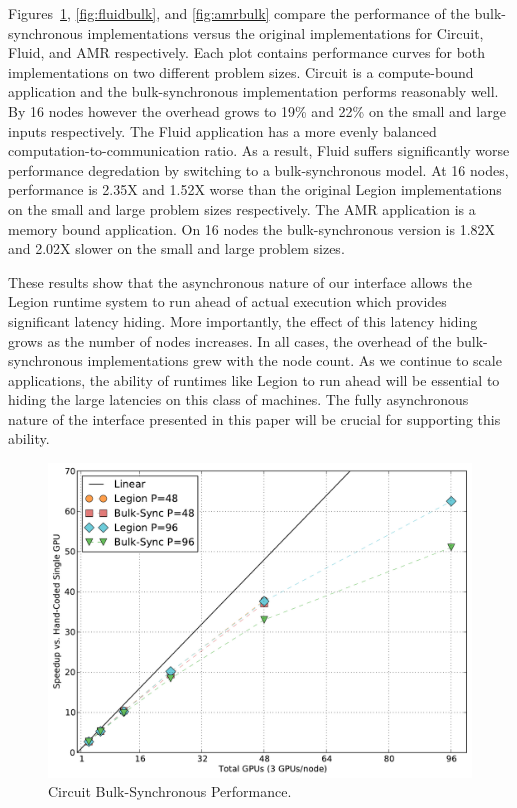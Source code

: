 Figures~\ref{fig:cktbulk}, \ref{fig:fluidbulk}, and \ref{fig:amrbulk} compare
the performance of the bulk-synchronous implementations versus the original
implementations for Circuit, Fluid, and AMR respectively.  Each plot contains
performance curves for both implementations on two different problem sizes.
Circuit is a compute-bound application and the bulk-synchronous implementation
performs reasonably well.  By 16 nodes however the overhead grows to 19\%
and 22\% on the small and large inputs respectively.  The Fluid application 
has a more evenly balanced computation-to-communication ratio.  As a result,
Fluid suffers significantly worse performance degredation by switching to
a bulk-synchronous model.  At 16 nodes, performance is 2.35X and 1.52X worse
than the original Legion implementations on the small and large problem sizes
respectively.  The AMR application is a memory bound application.  On 16 nodes
the bulk-synchronous version is 1.82X and 2.02X slower on the small and
large problem sizes.

These results show that the asynchronous nature of our interface allows
the Legion runtime system to run ahead of actual execution which
provides significant latency hiding.  More
importantly, the effect of this latency hiding grows as the number of
nodes increases.  In all cases, the overhead of the bulk-synchronous
implementations grew with the node count.  As we continue to scale
applications, the ability of runtimes like Legion to run ahead
will be essential to hiding the large latencies on this class of machines.
The fully asynchronous nature of the interface presented in this paper
will be crucial for supporting this ability.


\begin{figure}
\begin{center}
\includegraphics[scale=0.33]{figs/circuit_bulk_sync.pdf}
\end{center}
\vspace{-6mm}
\caption{Circuit Bulk-Synchronous Performance.\label{fig:cktbulk}}
\vspace{-4mm}
\end{figure}

